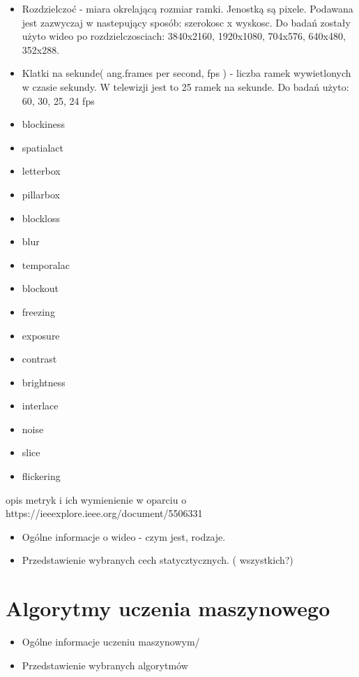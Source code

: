 \begin{itemize}
\item Rozdzielczoć -  miara okrelającą rozmiar ramki. Jenostką są pixele.  Podawana jest zazwyczaj w nastepujący sposób: szerokosc x wyskosc. Do badań zostały użyto wideo po rozdzielczosciach: 3840x2160, 1920x1080, 704x576, 640x480, 352x288.
\item Klatki na sekunde( ang.frames per second, fps ) - liczba ramek wywietlonych w czasie sekundy. W telewizji jest to 25 ramek na sekunde. Do badań użyto: 60, 30,  25, 24 fps  
\item blockiness
\item spatialact
\item letterbox 
\item pillarbox 
\item blockloss 
\item blur 
\item temporalac
\item blockout 
\item freezing 
\item exposure 
\item contrast 
\item brightness
\item interlace 
\item noise 
\item slice 
\item flickering
\end{itemize}

opis metryk i ich wymienienie  w oparciu o https://ieeexplore.ieee.org/document/5506331



\begin{itemize}
\item Ogólne informacje o wideo - czym jest, rodzaje.
\item Przedstawienie wybranych cech statycztycznych. ( wszystkich?) 
\end{itemize}


\section{Algorytmy uczenia maszynowego }
\label{cha:pierwszyDokument}

\begin{itemize}
\item Ogólne informacje uczeniu maszynowym/
\item Przedstawienie wybranych algorytmów 
\end{itemize}

